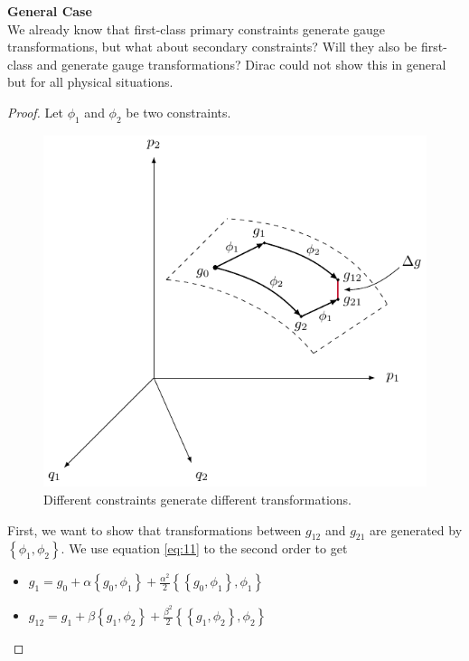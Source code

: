 \pagebreak

\textbf{General Case} \\

We already know that first-class primary constraints generate gauge transformations, but what about secondary constraints? Will they also be first-class and generate gauge transformations?
Dirac could not show this in general but for all physical situations.

\begin{proof}
Let $\phi_1$ and $\phi_2$ be two constraints.
\begin{figure}[H]
\begin{center}
\includegraphics[scale=1.2]{img/gauge2.pdf}
\end{center}
\caption{Different constraints generate different transformations.}
\label{fig:4}
\end{figure}
First, we want to show that transformations between $g_{12}$ and $g_{21}$ are generated by $\left\{ \phi_1 , \phi_2 \right \}$.
We use equation \eqref{eq:11} to the second order to get
\begin{itemize}
\item $g_1 = g_0 + \alpha \left\{ g_0 , \phi_1 \right \} + \frac{\alpha^2}{2} \left \{ \left \{ g_0 , \phi_1 \right \} , \phi_1 \right \} $
\item $g_{12} = g_1 + \beta \left\{ g_1 , \phi_2 \right \} + \frac{\beta^2}{2} \left \{ \left \{ g_1 , \phi_2 \right \} , \phi_2 \right \}  $

\end{itemize}
\end{proof}
